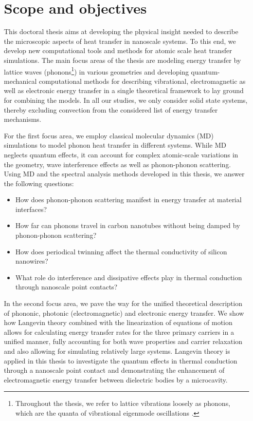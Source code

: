\section{Scope and objectives}

This doctoral thesis aims at developing the physical insight needed to describe the microscopic aspects of heat transfer in nanoscale systems. To this end, we develop new computational tools and methods for atomic scale heat transfer simulations. The main focus areas of the thesis are modeling energy transfer by lattice waves (phonons\footnote{Throughout the thesis, we refer to lattice vibrations loosely as phonons, which are the quanta of vibrational eigenmode oscillations \cite{ziman}.}) in various geometries and developing quantum-mechanical computational methods for describing vibrational, electromagnetic as well as electronic energy transfer in a single theoretical framework to lay ground for combining the models. In all our studies, we only consider solid state systems, thereby excluding convection \cite{chen} from the considered list of energy transfer mechanisms. 

For the first focus area, we employ classical molecular dynamics (MD) simulations to model phonon heat transfer in different systems. While MD neglects quantum effects, it can account for complex atomic-scale variations in the geometry, wave interference effects as well as phonon-phonon scattering. Using MD and the spectral analysis methods developed in this thesis, we answer the following questions: 
 \begin{itemize}
  \item How does phonon-phonon scattering manifest in energy transfer at material interfaces?
  \item How far can phonons travel in carbon nanotubes without being damped by phonon-phonon scattering?
  \item How does periodical twinning affect the thermal conductivity of silicon nanowires?
  \item What role do interference and dissipative effects play in thermal conduction through nanoscale point contacts?
 \end{itemize}

In the second focus area, we pave the way for the unified theoretical description of phononic, photonic (electromagnetic) and electronic energy transfer. We show how Langevin theory \cite{langevin08,zwanzig} combined with the linearization of equations of motion allows for calculating energy transfer rates for the three primary carriers in a unified manner, fully accounting for both wave properties and carrier relaxation and also allowing for simulating relatively large systems.  Langevin theory is applied in this thesis to investigate the quantum effects in thermal conduction through a nanoscale point contact and demonstrating the enhancement of electromagnetic energy transfer between dielectric bodies by a microcavity.

